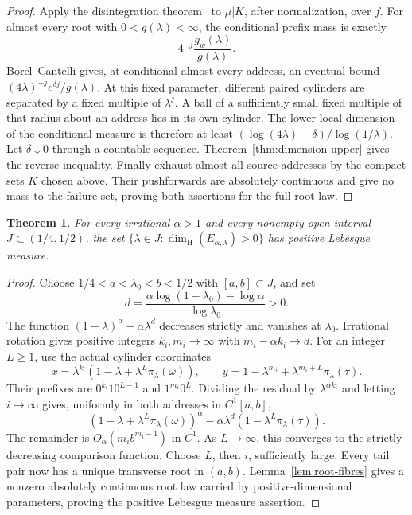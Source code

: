 \documentclass[11pt,a4paper]{amsart}
\numberwithin{equation}{section}
\newtheorem{theorem}{Theorem}[section]
\theoremstyle{definition}
\begin{document}
\begin{proof}
Apply the disintegration theorem~\cite{Kallenberg2021} to
\(\mu|K\), after normalization, over \(f\). For almost every root with
\(0<g(\lambda)<\infty\), the conditional prefix mass is exactly
\[
4^{-j}\frac{g_w(\lambda)}{g(\lambda)}.
\]
Borel--Cantelli gives, at conditional-almost every address,
an eventual bound
\((4\lambda)^{-j}e^{\delta j}/g(\lambda)\).
At this fixed parameter, different paired cylinders are separated
by a fixed multiple of \(\lambda^j\). A ball of a sufficiently
small fixed multiple of that radius about an address lies in its
own cylinder. The lower local dimension of the conditional
measure is therefore at least
\((\log(4\lambda)-\delta)/\log(1/\lambda)\).
Let \(\delta\downarrow0\) through a countable sequence.
Theorem~\ref{thm:dimension-upper} gives the reverse inequality.
Finally exhaust almost all source addresses by the compact sets
\(K\) chosen above. Their pushforwards are absolutely continuous
and give no mass to the failure set, proving both assertions for
the full root law.
\end{proof}

\begin{theorem}\label{thm:irrational-parameters}
For every irrational \(\alpha>1\) and every nonempty open interval
\(J\subset(1/4,1/2)\), the set
\(\{\lambda\in J:\dim_{\mathrm H}(E_{\alpha,\lambda})>0\}\)
has positive Lebesgue measure.
\end{theorem}
\begin{proof}
Choose \(1/4<a<\lambda_0<b<1/2\) with \([a,b]\subset J\), and set
\[
d=\frac{\alpha\log(1-\lambda_0)-\log \alpha}{\log\lambda_0}>0.
\]
The function \((1-\lambda)^\alpha-\alpha\lambda^d\) decreases strictly and
vanishes at \(\lambda_0\). Irrational rotation gives positive
integers \(k_i,m_i\to\infty\) with \(m_i-\alpha k_i\to d\).
For an integer \(L\geq1\), use the actual cylinder coordinates
\[
x=\lambda^{k_i}(1-\lambda+\lambda^L\pi_\lambda(\omega)),
\qquad
y=1-\lambda^{m_i}+\lambda^{m_i+L}\pi_\lambda(\tau).
\]
Their prefixes are \(0^{k_i}10^{L-1}\) and \(1^{m_i}0^L\).
Dividing the residual by \(\lambda^{\alpha k_i}\) and letting
\(i\to\infty\) gives, uniformly in both addresses in \(C^1[a,b]\),
\[
(1-\lambda+\lambda^L\pi_\lambda(\omega))^\alpha
-\alpha\lambda^d(1-\lambda^L\pi_\lambda(\tau)).
\]
The remainder is \(O_\alpha(m_i b^{m_i-1})\) in \(C^1\).
As \(L\to\infty\), this converges to the strictly decreasing
comparison function. Choose \(L\), then \(i\), sufficiently large.
Every tail pair now has a unique transverse root in \((a,b)\).
Lemma~\ref{lem:root-fibres} gives a nonzero absolutely continuous
root law carried by positive-dimensional parameters, proving the
positive Lebesgue measure assertion.
\end{proof}
\end{document}
